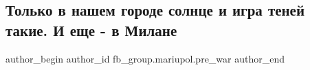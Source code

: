  
 
 
 
 

\subsection{Только в нашем городе солнце и игра теней такие. И еще - в Милане}
\label{sec:05_02_2023.fb.fb_group.mariupol.pre_war.1.tolko_v_nashem_gorod}

\ifcmt
 author_begin
   author_id fb_group.mariupol.pre_war
 author_end
\fi
